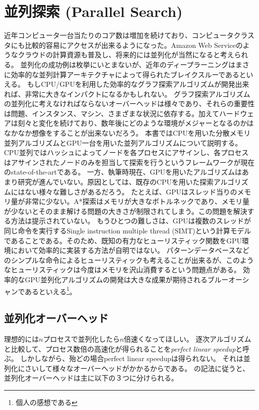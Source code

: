 \documentclass{report}
\begin{document}
\section{並列探索 (Parallel Search)}
近年コンピュータ一台当たりのコア数は増加を続けており、コンピュータクラスタにも比較的容易にアクセスが出来るようになった。Amazon Web Serviceのようなクラウドの計算資源も普及し、将来的には並列化が当然になると考えられる。
並列化の成功例は枚挙にいとまないが、近年のディープラーニングはまさに効率的な並列計算アーキテクチャによって得られたブレイクスルーであるといえる。
もしCPU/GPUを利用した効率的なグラフ探索アルゴリズムが開発出来れば、非常に大きなインパクトになるかもしれない。
グラフ探索アルゴリズムの並列化に考えなければならないオーバーヘッドは様々であり、それらの重要性は問題、インスタンス、マシン、さまざまな状況に依存する。加えてハードウェアは刻々と変化を続けており、数年後にどのような環境がメジャーとなるのかはなかなか想像をすることが出来ないだろう。
本書ではCPUを用いた分散メモリ並列アルゴリズムとGPU一台を用いた並列アルゴリズムについて説明する。
CPU並列ではハッシュによってノードを各プロセスにアサインし、各プロセスはアサインされたノードのみを担当して探索を行うというフレームワークが現在のstate-of-the-artである。
一方、執筆時現在、GPUを用いたアルゴリズムはあまり研究が進んでいない。原因としては、既存のCPUを用いた探索アルゴリズムにはない様々な難しさがあるだろう。
たとえば、GPUはスレッド当りのメモリ量が非常に少ない。A*探索はメモリが大きなボトルネックであり、メモリ量が少ないとそのまま解ける問題の大きさが制限されてしまう。この問題を解決する方法は提示されていない。
もうひとつの難しさは、GPUは複数のスレッドが同じ命令を実行するSingle instruction multiple thread (SIMT)という計算モデルであることである。そのため、既知の有力なヒューリスティック関数をGPU環境において効率的に実装する方法が自明ではない。
パターンデータベースなどのシンプルな命令によるヒューリスティックも考えることが出来るが、このようなヒューリスティックは今度はメモリを沢山消費するという問題点がある。
効率的なGPU並列化アルゴリズムの開発は大きな成果が期待されるブルーオーシャンであるといえる\footnote{個人の感想である}。

\subsection{並列化オーバーヘッド}

理想的には$n$プロセスで並列化したら$n$倍速くなってほしい。
逐次アルゴリズムと比較して、プロセス数倍の高速化が得られることを{\it perfect linear speedup}と呼ぶ。
しかしながら、殆どの場合perfect linear speedupは得られない。
それは並列化にさいして様々なオーバーヘッドがかかるからである。
\cite{jinnai2017work}の記法に従うと、並列化オーバーヘッドは主に以下の３つに分けられる。
\end{document}
